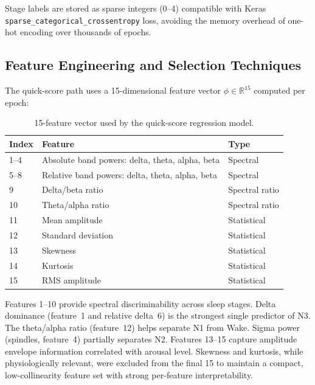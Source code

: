 \documentclass[10pt]{article}
\begin{document}
Stage labels are stored as sparse integers (0--4) compatible with Keras \texttt{sparse\_categorical\_crossentropy} loss, avoiding the memory overhead of one-hot encoding over thousands of epochs.

\subsection{Feature Engineering and Selection Techniques}
\label{sec:featureEngg}

The quick-score path uses a 15-dimensional feature vector $\phi \in \mathbb{R}^{15}$ computed per epoch:

\begin{table}[h]
\centering
\small
\renewcommand{\arraystretch}{1.2}
\begin{tabular}{|l|l|l|}
\hline
\textbf{Index} & \textbf{Feature} & \textbf{Type} \\\hline
1--4 & Absolute band powers: delta, theta, alpha, beta & Spectral \\\hline
5--8 & Relative band powers: delta, theta, alpha, beta & Spectral \\\hline
9 & Delta/beta ratio & Spectral ratio \\\hline
10 & Theta/alpha ratio & Spectral ratio \\\hline
11 & Mean amplitude & Statistical \\\hline
12 & Standard deviation & Statistical \\\hline
13 & Skewness & Statistical \\\hline
14 & Kurtosis & Statistical \\\hline
15 & RMS amplitude & Statistical \\\hline
\end{tabular}
\caption{15-feature vector used by the quick-score regression model.}
\label{tab:features}
\end{table}

Features 1--10 provide spectral discriminability across sleep stages. Delta dominance (feature~1 and relative delta~6) is the strongest single predictor of N3. The theta/alpha ratio (feature~12) helps separate N1 from Wake. Sigma power (spindles, feature~4) partially separates N2. Features 13--15 capture amplitude envelope information correlated with arousal level. Skewness and kurtosis, while physiologically relevant, were excluded from the final 15 to maintain a compact, low-collinearity feature set with strong per-feature interpretability.
\end{document}
